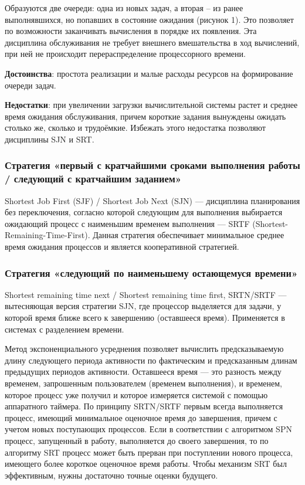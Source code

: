 Образуются две очереди: одна из новых задач, а вторая – из ранее выполнявшихся, но попавших в состояние ожидания (рисунок 1). Это позволяет по возможности заканчивать вычисления в порядке их появления. Эта дисциплина обслуживания не требует внешнего вмешательства в ход вычислений, при ней не происходит перераспределение процессорного времени. 

\textbf{Достоинства}: простота реализации и малые расходы ресурсов на формирование очереди задач.

\textbf{Недостатки}: при увеличении загрузки вычислительной системы растет и среднее время ожидания обслуживания, причем короткие задания вынуждены ожидать столько же, сколько и трудоёмкие. Избежать этого недостатка позволяют дисциплины SJN и SRT.


\subsubsection{Стратегия «первый с кратчайшими сроками выполнения работы / следующий с кратчайшим заданием»}
Shortest Job First (SJF) / Shortest Job Next (SJN) — дисциплина планирования без переключения, согласно которой следующим для выполнения выбирается ожидающий процесс с наименьшим временем выполнения — SRTF (Shortest-Remaining-Time-First). Данная стратегия обеспечивает минимальное среднее время ожидания процессов и является кооперативной стратегией.

\subsubsection{Стратегия «следующий по наименьшему остающемуся времени»}
Shortest remaining time next / Shortest remaining time first, SRTN/SRTF — вытесняющая версия стратегии SJN, где процессор выделяется для задачи, у которой время ближе всего к завершению (оставшееся время). Применяется в системах с разделением времени. 

Метод экспоненциального усреднения позволяет вычислить предсказываемую длину следующего периода активности по фактическим и предсказанным длинам предыдущих периодов активности.
Оставшееся время — это разность между временем, запрошенным пользователем (временем выполнения), и временем, которое процесс уже получил и которое измеряется системой с помощью аппаратного таймера. По принципу SRTN/SRTF первым всегда выполняется процесс, имеющий минимальное оценочное время до завершения, причем с учетом новых поступающих процессов. Если в соответствии с алгоритмом SPN процесс, запущенный в работу, выполняется до своего завершения, то по алгоритму SRT процесс может быть прерван при поступлении нового процесса, имеющего более короткое оценочное время работы. Чтобы механизм SRT был эффективным, нужны достаточно точные оценки будущего.

